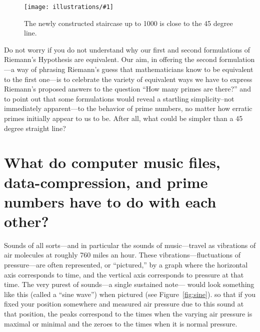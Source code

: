 \documentclass[11pt]{article}
\newcommand{\ill}[3]{ 
   \begin{figure}[H]
   \begin{center}
   \texttt{[image: illustrations/\#1]}
   \caption{#3}
   \end{center}
    \end{figure}
}
\theoremstyle{plain}
\theoremstyle{definition}
\numberwithin{equation}{section}
\numberwithin{figure}{section}
\numberwithin{table}{section}
\begin{document}
          \begin{center}
\end{center}

\ill{psi_diag_1000}{0.4}{The newly constructed staircase up to 1000 is close to the 45 degree line.}

Do not worry if you do not understand why our first and second
formulations of Riemann's Hypothesis are equivalent. Our aim, in
offering the second formulation---a way of phrasing Riemann's guess
that mathematicians know to be equivalent to the first one---is to
celebrate the variety of equivalent ways we have to express Riemann's
proposed answers to the question ``How many primes are there?'' and to
point out that some formulations would reveal a startling
simplicity--not immediately apparent---to the behavior of prime
numbers, no matter how erratic primes initially appear to us to
be. After all, what could be simpler than a 45 degree straight line?
 
 \bigskip


\section{What do  computer music files,  data-compression, and prime numbers have to do with each other?}

\bigskip


Sounds of all sorts---and in particular the sounds of music---travel
as vibrations of air molecules at roughly 760 miles an hour. These
vibrations---fluctuations of pressure---are often represented, or
``pictured,'' by a graph where the horizontal axis corresponds to
time, and the vertical axis corresponds to pressure at that time.  The
very purest of sounds---a single sustained note--- would look
something like this (called a ``sine wave'') when pictured (see
Figure~\ref{fig:sine}).  so that if you fixed your position somewhere
and measured air pressure due to this sound at that position, the
peaks correspond to the times when the varying air pressure is maximal
or minimal and the zeroes to the times when it is normal pressure.
\end{document}
